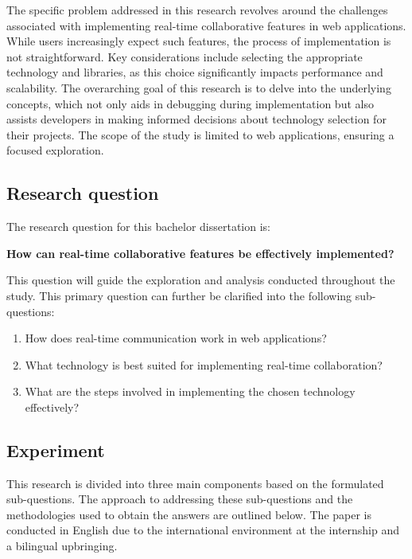 The specific problem addressed in this research revolves around the challenges associated with implementing real-time collaborative features in web applications. While users increasingly expect such features, the process of implementation is not straightforward. Key considerations include selecting the appropriate technology and libraries, as this choice significantly impacts performance and scalability. The overarching goal of this research is to delve into the underlying concepts, which not only aids in debugging during implementation but also assists developers in making informed decisions about technology selection for their projects. The scope of the study is limited to web applications, ensuring a focused exploration.

\subsection{Research question}

The research question for this bachelor dissertation is:

\textbf{How can real-time collaborative features be effectively implemented?}

This question will guide the exploration and analysis conducted throughout the study. This primary question can further be clarified into the following sub-questions:

\begin{enumerate}
    \item How does real-time communication work in web applications?
    \item What technology is best suited for implementing real-time collaboration?
    \item What are the steps involved in implementing the chosen technology effectively?
\end{enumerate}

\subsection{Experiment}

This research is divided into three main components based on the formulated sub-questions. The approach to addressing these sub-questions and the methodologies used to obtain the answers are outlined below. The paper is conducted in English due to the international environment at the internship and a bilingual upbringing.

